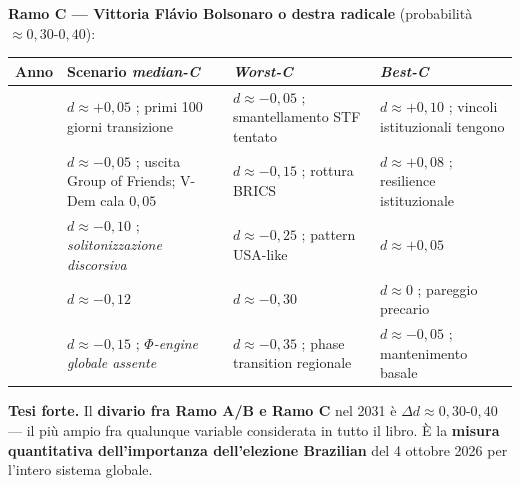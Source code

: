 \textbf{Ramo C --- Vittoria Flávio Bolsonaro o destra radicale}
(probabilità \(\approx 0{,}30\)-\(0{,}40\)):

{\def\LTcaptype{none} %
{\small\begin{longtable}[]{@{}
  >{\raggedright\arraybackslash}p{}
  >{\raggedright\arraybackslash}p{}
  >{\raggedright\arraybackslash}p{}
  >{\raggedright\arraybackslash}p{}@{}}
\toprule\noalign{}
\begin{minipage}[b]{\linewidth}\raggedright
Anno
\end{minipage} & \begin{minipage}[b]{\linewidth}\raggedright
Scenario \emph{median-C}
\end{minipage} & \begin{minipage}[b]{\linewidth}\raggedright
\emph{Worst-C}
\end{minipage} & \begin{minipage}[b]{\linewidth}\raggedright
\emph{Best-C}
\end{minipage} \\
\midrule\noalign{}
\endhead
\bottomrule\noalign{}
\endlastfoot
2027 & \(d \approx +0{,}05\) ; primi 100 giorni transizione &
\(d \approx -0{,}05\) ; smantellamento STF tentato &
\(d \approx +0{,}10\) ; vincoli istituzionali tengono \\
2028 & \(d \approx -0{,}05\) ; uscita Group of Friends; V-Dem cala
\(0{,}05\) & \(d \approx -0{,}15\) ; rottura BRICS &
\(d \approx +0{,}08\) ; resilience istituzionale \\
2029 & \(d \approx -0{,}10\) ; \emph{solitonizzazione discorsiva} &
\(d \approx -0{,}25\) ; pattern USA-like & \(d \approx +0{,}05\) \\
2030 & \(d \approx -0{,}12\) & \(d \approx -0{,}30\) & \(d \approx 0\) ;
pareggio precario \\
2031 & \(d \approx -0{,}15\) ; \emph{$\Phi$-engine globale assente} &
\(d \approx -0{,}35\) ; phase transition regionale &
\(d \approx -0{,}05\) ; mantenimento basale \\
\end{longtable}}
}

\Hypoth{} \textbf{Tesi forte.} Il \textbf{divario fra Ramo A/B e Ramo C}
nel 2031 è \(\Delta d \approx 0{,}30\)-\(0{,}40\) --- il più ampio fra
qualunque variable considerata in tutto il libro. È la \textbf{misura
quantitativa dell'importanza dell'elezione Brazilian} del 4 ottobre
2026 per l'intero sistema globale.



